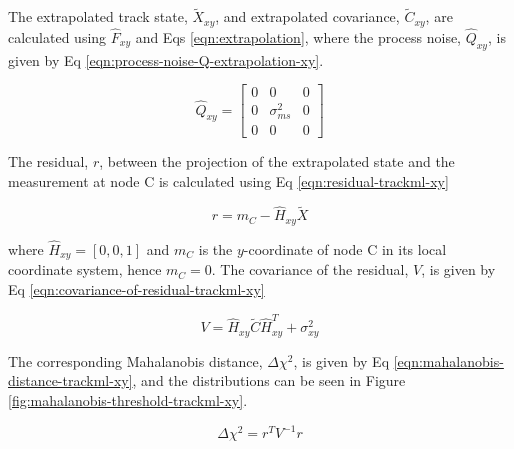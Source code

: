 The extrapolated track state, $\tilde{X}_{xy}$, and extrapolated covariance, $\tilde{C}_{xy}$, are calculated using $\hat{F}_{xy}$ and Eqs \eqref{eqn:extrapolation}, where the process noise, $\hat{Q}_{xy}$, is given by Eq \eqref{eqn:process-noise-Q-extrapolation-xy}.

\begin{equation}
\hat{Q}_{xy} = \begin{bmatrix} 
                0 & 0 & 0 \\ 
                0 & \sigma_{ms}^2 & 0 \\
                0 & 0 & 0 \end{bmatrix} 
\label{eqn:process-noise-Q-extrapolation-xy}
\end{equation}

The residual, $r$, between the projection of the extrapolated state and the measurement at node C is calculated using Eq \eqref{eqn:residual-trackml-xy}

\begin{equation}
r = m_C - \hat{H}_{xy} \tilde{X}
\label{eqn:residual-trackml-xy}
\end{equation}

where $\hat{H}_{xy} = [0, 0, 1]$ and $m_C$ is the $y$-coordinate of node C in its local coordinate system, hence $m_C = 0$. The covariance of the residual, $V$, is given by Eq \eqref{eqn:covariance-of-residual-trackml-xy}

\begin{equation}
{V} = \hat{H}_{xy} \widetilde{C} \hat{H}^{T}_{xy} + \sigma_{xy}^{2}
\label{eqn:covariance-of-residual-trackml-xy}
\end{equation}

The corresponding Mahalanobis distance, $\Delta \chi^{2}$, is given by Eq \eqref{eqn:mahalanobis-distance-trackml-xy}, and the distributions can be seen in Figure \ref{fig:mahalanobis-threshold-trackml-xy}.

\begin{equation}
\Delta \chi^{2} = r^{T} {V}^{-1} r
\label{eqn:mahalanobis-distance-trackml-xy}
\end{equation}




